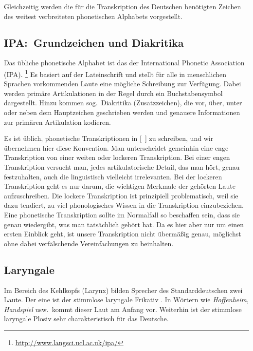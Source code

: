 
Gleichzeitig werden die für die Transkription des Deutschen benötigten Zeichen des weitest verbreiteten phonetischen Alphabets vorgestellt.

\subsection{IPA:\ Grundzeichen und Diakritika}


Das übliche phonetische Alphabet ist das der International Phonetic Association (IPA).%
\footnote{\url{http://www.langsci.ucl.ac.uk/ipa/}}
Es basiert auf der Lateinschrift und stellt für alle in menschlichen Sprachen vorkommenden Laute eine mögliche Schreibung zur Verfügung.
Dabei werden primäre Artikulationen in der Regel durch ein Buchstabensymbol dargestellt.
Hinzu kommen sog.\ Diakritika (Zusatzzeichen), die vor, über, unter oder neben dem Hauptzeichen geschrieben werden und genauere Informationen zur primären Artikulation kodieren.

Es ist üblich, phonetische Transkriptionen in [~] zu schreiben, und wir übernehmen hier diese Konvention.
Man unterscheidet gemeinhin eine enge Transkription von einer weiten oder lockeren Transkription.
Bei einer engen Transkription versucht man, jedes artikulatorische Detail, das man hört, genau festzuhalten, auch die linguistisch vielleicht irrelevanten.
Bei der lockeren Transkription geht es nur darum, die wichtigen Merkmale der gehörten Laute aufzuschreiben.
Die lockere Transkription ist prinzipiell problematisch, weil sie dazu tendiert, zu viel phonologisches Wissen in die Transkription einzubeziehen.
Eine phonetische Transkription sollte im Normalfall so beschaffen sein, dass sie genau wiedergibt, was man tatsächlich gehört hat.
Da es hier aber nur um einen ersten Einblick geht, ist unsere Transkription nicht übermäßig genau, möglichst ohne dabei verfälschende Vereinfachungen zu beinhalten.

\subsection{Laryngale}

\label{sec:photlaryngale}


Im Bereich des Kehlkopfs (Larynx) bilden Sprecher des Standarddeutschen zwei Laute.
Der eine ist der stimmlose laryngale Frikativ \textipa{[h]}.
In Wörtern wie \textit{Hoffenheim}, \textit{Handspiel} usw.\ kommt dieser Laut am Anfang vor.
Weiterhin ist der stimmlose laryngale Plosiv \textipa{[P]} sehr charakteristisch für das Deutsche.

